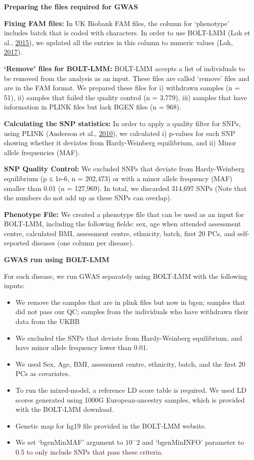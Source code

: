 \documentclass[12pt,twoside]{unicam}
\providecommand{\tightlist}{%
  \setlength{\itemsep}{0pt}\setlength{\parskip}{0pt}}
\begin{document}
\textbf{Preparing the files required for GWAS}

\textbf{Fixing FAM files:} In UK Biobank FAM files, the column for `phenotype' includes batch that is coded with characters. In order to use BOLT-LMM (Loh et al., \protect\hyperlink{ref-Loh2015}{2015}), we updated all the entries in this column to numeric values (Loh, \protect\hyperlink{ref-Loh2017}{2017}).

\textbf{`Remove' files for BOLT-LMM:} BOLT-LMM accepts a list of individuals to be removed from the analysis as an input. These files are called `remove' files and are in the FAM format. We prepared these files for i) withdrawn samples (n = 51), ii) samples that failed the quality control (n = 3,779), iii) samples that have information in PLINK files but lack BGEN files (n = 968).

\textbf{Calculating the SNP statistics:} In order to apply a quality filter for SNPs, using PLINK (Anderson et al., \protect\hyperlink{ref-Anderson2010}{2010}), we calculated i) p-values for each SNP showing whether it deviates from Hardy-Weinberg equilibrium, and ii) Minor allele frequencies (MAF).

\textbf{SNP Quality Control:} We excluded SNPs that deviate from Hardy-Weinberg equilibrium (p ≤ 1e-6, n = 202,473) or with a minor allele frequency (MAF) smaller than 0.01 (n = 127,969). In total, we discarded 314,697 SNPs (Note that the numbers do not add up as these SNPs can overlap).

\textbf{Phenotype File:} We created a phenotype file that can be used as an input for BOLT-LMM, including the following fields: sex, age when attended assessment centre, calculated BMI, assessment centre, ethnicity, batch, first 20 PCs, and self-reported diseases (one column per disease).

\textbf{GWAS run using BOLT-LMM}

For each disease, we run GWAS separately using BOLT-LMM with the following inputs:

\begin{itemize}
\tightlist
\item
  We remove the samples that are in plink files but now in bgen; samples that did not pass our QC; samples from the individuals who have withdrawn their data from the UKBB
\item
  We excluded the SNPs that deviate from Hardy-Weinberg equilibrium, and have minor allele frequency lower than 0.01.
\item
  We used Sex, Age, BMI, assessment centre, ethnicity, batch, and the first 20 PCs as covariates.
\item
  To run the mixed-model, a reference LD score table is required. We used LD scores generated using 1000G European-ancestry samples, which is provided with the BOLT-LMM download.
\item
  Genetic map for hg19 file provided in the BOLT-LMM website.
\item
  We set `bgenMinMAF' argument to \(10^-2\) and `bgenMinINFO' parameter to 0.5 to only include SNPs that pass these criteria.
\end{itemize}
\end{document}
